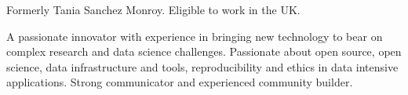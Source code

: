 


\begin{cvparagraph}

Formerly Tania Sanchez Monroy. Eligible to work
in the UK.

A passionate innovator with experience in bringing new technology to bear on
complex research and data science challenges. Passionate about open source, open science, data infrastructure and tools,  reproducibility and ethics in data intensive applications. 
Strong communicator and experienced community builder.
\end{cvparagraph}
